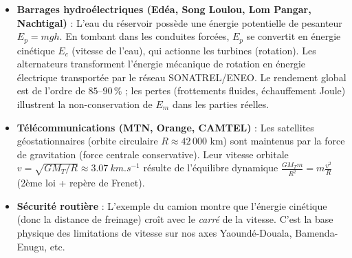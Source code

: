 \documentclass[11pt]{article}
\begin{document}
\begin{savaistu}
\begin{itemize}
\item \textbf{Barrages hydroélectriques (Edéa, Song Loulou, Lom Pangar, Nachtigal)} : L'eau du réservoir possède une énergie potentielle de pesanteur $E_p = mgh$. En tombant dans les conduites forcées, $E_p$ se convertit en énergie cinétique $E_c$ (vitesse de l'eau), qui actionne les turbines (rotation). Les alternateurs transforment l'énergie mécanique de rotation en énergie électrique transportée par le réseau SONATREL/ENEO. Le rendement global est de l'ordre de $85\text{--}90\,\%$ ; les pertes (frottements fluides, échauffement Joule) illustrent la non-conservation de $E_m$ dans les parties réelles.
\item \textbf{Télécommunications (MTN, Orange, CAMTEL)} : Les satellites géostationnaires (orbite circulaire $R \approx 42\,000$ km) sont maintenus par la force de gravitation (force centrale conservative). Leur vitesse orbitale $v = \sqrt{GM_T/R} \approx \SI{3,07}{km.s^{-1}}$ résulte de l'équilibre dynamique $\frac{GM_T m}{R^2} = m\frac{v^2}{R}$ (2ème loi + repère de Frenet).
\item \textbf{Sécurité routière} : L'exemple du camion montre que l'énergie cinétique (donc la distance de freinage) croît avec le \emph{carré} de la vitesse. C'est la base physique des limitations de vitesse sur nos axes Yaoundé-Douala, Bamenda-Enugu, etc.
\end{itemize}
\end{savaistu}
\end{document}
